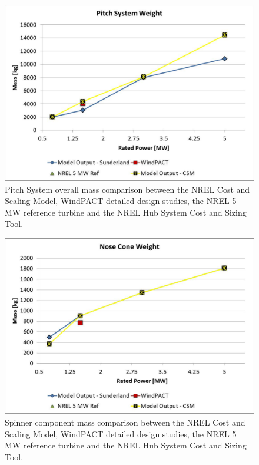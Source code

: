 \documentclass[letterpaper,10pt,openany,oneside]{sphinxmanual}
\begin{document}
\begin{figure}[htbp]
\centering
\capstart

\includegraphics[width=6.5in]{pitchsysmass.pdf}
\caption{Pitch System overall mass comparison between the NREL Cost and Scaling Model, WindPACT detailed design studies, the NREL 5 MW reference turbine and the NREL Hub System Cost and Sizing Tool.}\label{theory:pitchsysmass}\end{figure}
\begin{figure}[htbp]
\centering
\capstart

\includegraphics[width=6.5in]{spinnermass.pdf}
\caption{Spinner component mass comparison between the NREL Cost and Scaling Model, WindPACT detailed design studies, the NREL 5 MW reference turbine and the NREL Hub System Cost and Sizing Tool.}\label{theory:spinnermass}\end{figure}
\end{document}
